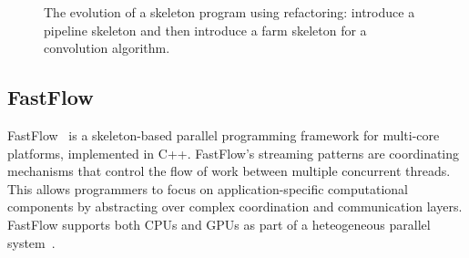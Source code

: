 \documentclass[smallextended]{svjour3}
\begin{document}
\begin{figure}
\begin{center}
% 
% 
%
%
%
% 
%
% 
% 
\caption{The evolution of a skeleton program using refactoring: introduce a pipeline skeleton and then introduce a farm skeleton for a convolution algorithm.}
\label{refacex}
\end{center}
\end{figure}

\subsection{FastFlow}
\noindent
FastFlow~\cite{AldinucciDKMT11} is a skeleton-based parallel programming framework
for multi-core platforms, implemented in C++.
FastFlow's streaming patterns are coordinating mechanisms
that control the flow of work between multiple concurrent
threads. This allows programmers to focus on
application-specific computational components by
abstracting over complex coordination and communication
layers. 
FastFlow supports both CPUs and GPUs as part of a heteogeneous parallel system~\cite{mpdp}.
\end{document}
